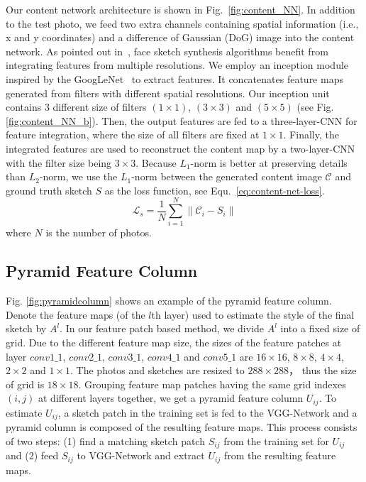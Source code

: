 \documentclass[10pt,twocolumn,letterpaper]{article}
\begin{document}
Our content network architecture is shown in Fig.~\ref{fig:content_NN}. In addition to the test photo, we feed two extra channels containing spatial information (i.e., x and y coordinates) and a difference of Gaussian (DoG) image into the content network. As pointed out in~\cite{wang2009face}, face sketch synthesis algorithms benefit from integrating features from multiple resolutions. We employ an inception module inspired by the GoogLeNet~\cite{szegedy2015going} to extract features. It concatenates feature maps generated from filters with different spatial resolutions. Our inception unit contains 3 different size of filters $(1\times1)$, $(3\times3)$ and $(5\times5)$ (see Fig. \ref{fig:content_NN_b}). Then, the output features are fed to a three-layer-CNN for feature integration, where the size of all filters are fixed at $1\times1$. Finally, the integrated features are used to reconstruct the content map by a two-layer-CNN with the filter size being $3\times3$. Because $L_1$-norm is better at preserving details than $L_2$-norm, we use the $L_1$-norm between the generated content image $\mathcal{C}$ and ground truth sketch $S$ as the loss function, see Equ.~\ref{eq:content-net-loss}.
\begin{equation}
\mathcal{L}_s = \frac{1}{N} \sum \limits_{i=1}^N \|\mathcal{C}_i - S_i\| \label{eq:content-net-loss}
\end{equation}
where $N$ is the number of photos. 

\subsection{Pyramid Feature Column}

Fig. \ref{fig:pyramidcolumn} shows an example of the pyramid feature column. Denote the feature maps (of the $l$th layer) used to estimate the style of the final sketch by $A^{l}$. In our feature patch based method, we divide $A^{l}$ into a fixed size of grid. Due to the different feature map size, the sizes of the feature patches at layer $conv1\_1$, $conv2\_1$, $conv3\_1$, $conv4\_1$ and $conv5\_1$ are $16\times16$, $8\times8$, $4\times4$, $2\times2$ and $1\times1$. The photos and sketches are resized to $288\times288$， thus the size of grid is $18\times18$. Grouping feature map patches having the same grid indexes $(i, j)$ at different layers together, we get a pyramid feature column $U_{ij}$. To estimate $U_{ij}$, a sketch patch in the training set is fed to the VGG-Network and a pyramid column is composed of the resulting feature maps. This process consists of two steps: (1) find a matching sketch patch $S_{ij}$ from the training set for $U_{ij}$ and (2) feed $S_{ij}$ to VGG-Network and extract $U_{ij}$ from the resulting feature maps.
\end{document}
